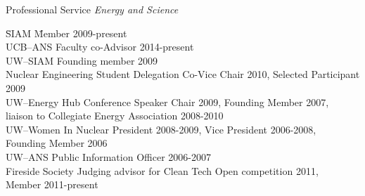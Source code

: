 \documentclass{resume2} %
\begin{document}
\begin{rSection}{Professional Service}
\textit{Energy and Science}
\begin{tabbing}
\hspace*{2 em}\= SIAM  \hspace*{15em} \= Member 2009-present\\
%
\> UCB--ANS \> Faculty co-Advisor 2014-present  \\
%
\> UW--SIAM \> Founding member 2009\\
%
\> Nuclear Engineering Student Delegation \> Co-Vice Chair 2010, Selected Participant 2009\\
%
\> UW--Energy Hub \> Conference Speaker Chair 2009, Founding Member 2007,  \\ \> \> liaison to Collegiate Energy Association 2008-2010\\
%
\> UW--Women In Nuclear \> President 2008-2009, Vice President 2006-2008,  \\ \> \> Founding Member 2006\\
%
\> UW--ANS \> Public Information Officer 2006-2007 \\
%
\> Fireside Society \> Judging advisor for Clean Tech Open competition 2011,  \\ \> \>Member 2011-present
\end{tabbing}


\end{rSection}





\end{document}
